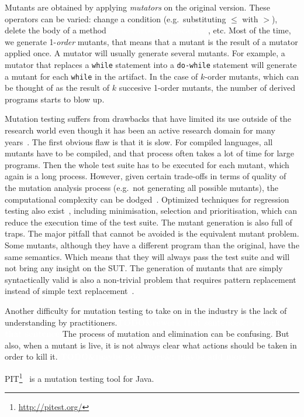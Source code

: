 \documentclass[11pt]{sdm_internship}
\newcommand{\addref}[1]{\colorbox{TealBlue!100}{\textcolor{white}{\textbf{$[$\ifx&#1&\ \else#1\fi$]$}}}}
\newcommand{\todo}[1]{\colorbox{Red!75}{\textcolor{white}{\textbf{TODO\ifx&#1&\else: #1\fi}}}}
\theoremstyle{definition}
\begin{document}
Mutants are obtained by applying \emph{mutators} on the original version.
These operators can be varied: change a condition (e.g.\ substituting $\leq$ with $>$), delete the body of a method \addref{descartes}, etc.
Most of the time, we generate 1-\emph{order} mutants, that means that a mutant is the result of a mutator applied once.
A mutator will usually generate several mutants.
For example, a mutator that replaces a \texttt{while} statement into a \texttt{do-while} statement will generate a mutant for each \texttt{while} in the artifact.
In the case of $k$-order mutants, which can be thought of as the result of $k$ succesive 1-order mutants\cite{wah2000theoretical}, the number of derived programs starts to blow up.

Mutation testing suffers from drawbacks that have limited its use outside of the research world even though it has been an active research domain for many years~\cite{jia2011analysis}.
The first obvious flaw is that it is slow.
For compiled languages, all mutants have to be compiled, and that process often takes a lot of time for large programs.
Then the whole test suite has to be executed for each mutant, which again is a long process.
However, given certain trade-offs in terms of quality of the mutation analysis process (e.g.\ not generating all possible mutants), the computational complexity can be dodged~\cite{offutt1993experimental,movzucha2016mutation}.
Optimized techniques for regression testing also exist~\cite{yoo2012regression}, including minimisation, selection and prioritisation, which can reduce the execution time of the test suite.
The mutant generation is also full of traps.
The major pitfall that cannot be avoided is the equivalent mutant problem.
Some mutants, although they have a different program than the original, have the same semantics.
Which means that they will always pass the test suite and will not bring any insight on the SUT\@.
The generation of mutants that are simply syntactically valid is also a non-trivial problem that requires pattern replacement instead of simple text replacement~\cite{simao2009transformational}.

Another difficulty for mutation testing to take on in the industry is the lack of understanding by practitioners.\todo{rework that sentence}
The process of mutation and elimination can be confusing.
But also, when a mutant is live, it is not always clear what actions should be taken in order to kill it.
\todo{maybe add more}

PIT\footnote{\url{http://pitest.org/}}~\cite{coles2016pit} is a mutation testing tool for Java.
\end{document}
